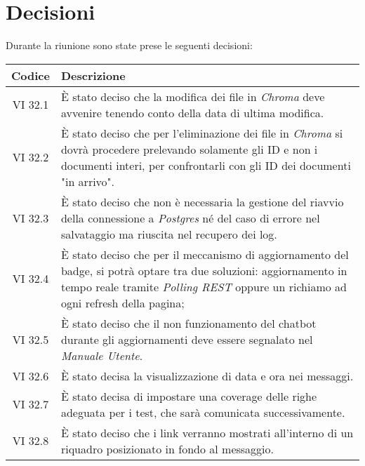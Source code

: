 
\section{Decisioni}

Durante la riunione sono state prese le seguenti decisioni:

\vspace{0.5cm}

\begin{table}[htbp]
    \centering
    \begin{tabular}{|c|p{}|}
        \hline
        \rowcolor[gray]{0.75}
        \textbf{Codice} & \textbf{Descrizione}\\
        \hline
        VI 32.1 & È stato deciso che la modifica dei file in \emph{Chroma} deve avvenire tenendo conto della data di ultima modifica.\\
        \hline
        VI 32.2 & È stato deciso che per l'eliminazione dei file in \emph{Chroma} si dovrà procedere prelevando solamente gli ID e non i documenti interi, per confrontarli con gli ID dei documenti "in arrivo".\\
        \hline
        VI 32.3 & È stato deciso che non è necessaria la gestione del riavvio della connessione a \emph{Postgres} né del caso di errore nel salvataggio ma riuscita nel recupero dei log.\\
        \hline 
        VI 32.4 & È stato deciso che per il meccanismo di aggiornamento del badge, si potrà optare tra due soluzioni: aggiornamento in tempo reale tramite \emph{Polling REST} oppure un richiamo ad ogni refresh della pagina;\\
        \hline
        VI 32.5 & È stato deciso che il non funzionamento del chatbot durante gli aggiornamenti deve essere segnalato nel \emph{Manuale Utente}.\\
        \hline
        VI 32.6 & È stato decisa la visualizzazione di data e ora nei messaggi.\\
        \hline
        VI 32.7 & È stato decisa di impostare una coverage delle righe adeguata per i test, che sarà comunicata successivamente.\\
        \hline
        VI 32.8 & È stato deciso che i link verranno mostrati all'interno di un riquadro posizionato in fondo al messaggio. \\
        \hline

\end{tabular}
\end{table}
